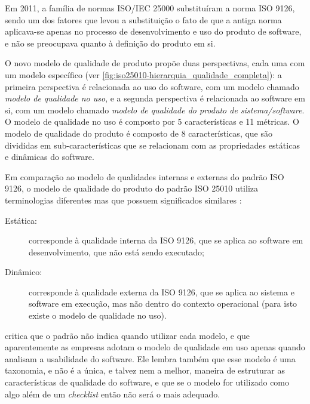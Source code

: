 \documentclass[
	12pt,				%
	openright,			%
	oneside,			%
	a4paper,			%
	english,			%
	brazil,				%
	]{abntex2}
\begin{document}
Em 2011, a família de normas ISO/IEC 25000 substituíram a norma ISO 9126, sendo um dos fatores que levou a substituição o fato de que a antiga norma aplicava-se apenas no processo de desenvolvimento e uso do produto de software, e não se preocupava quanto à definição do produto em si.

O novo modelo de qualidade de produto propõe duas perspectivas, cada uma com um modelo específico (ver \autoref{fig:iso25010-hierarquia_qualidade_completa}): a primeira perspectiva é relacionada ao uso do software, com um modelo chamado \emph{modelo de qualidade no uso}, e a segunda perspectiva é relacionada ao software em si, com um modelo chamado \emph{modelo de qualidade do produto de sistema/software}. O modelo de qualidade no uso é composto por 5 características e 11 métricas. O modelo de qualidade do produto é composto de 8 características, que são divididas em sub-características que se relacionam com as propriedades estáticas e dinâmicas do software.

Em comparação ao modelo de qualidades internas e externas do padrão ISO 9126, o modelo de qualidade do produto do padrão ISO 25010 utiliza terminologias diferentes mas que possuem significados similares \cite{SURYN2014}:

\begin{description}
    \item [Estática:] corresponde à qualidade interna da ISO 9126, que se aplica ao software em desenvolvimento, que não está sendo executado;
    \item [Dinâmico:] corresponde à qualidade externa da ISO 9126, que se aplica ao sistema e software em execução, mas não dentro do contexto operacional (para isto existe o modelo de qualidade no uso).
\end{description}

 critica que o padrão não indica quando utilizar cada modelo, e que aparentemente as empresas adotam o modelo de qualidade em uso apenas quando analisam a usabilidade do software. Ele lembra também que esse modelo é uma taxonomia, e não é a única, e talvez nem a melhor, maneira de estruturar as características de qualidade do software, e que se o modelo for utilizado como algo além de um \emph{checklist} então não será o mais adequado.
\end{document}
